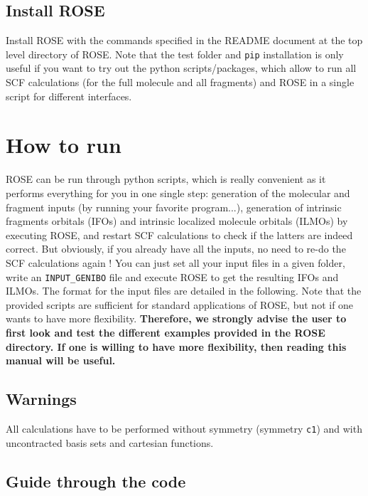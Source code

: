 \documentclass[preprint]{revtex4-1}
\begin{document}
\subsection{Install ROSE}

Install ROSE with the commands specified in the README document at the top level directory of ROSE.
Note that the test folder and \verb|pip| installation is only useful if you want to try out the
python scripts/packages, which allow to run
all SCF calculations (for the full molecule and all fragments)
and ROSE in a single script for different interfaces.

\section{How to run}

ROSE can be run through python scripts, which is really convenient as
it performs everything for you in one single step: generation of the molecular and fragment
inputs (by running your favorite program...), generation of intrinsic fragments orbitals (IFOs) and intrinsic localized molecule orbitals (ILMOs) by executing ROSE,
and restart SCF calculations to check if the latters are indeed correct.
But obviously, if you already have all the inputs, no need to re-do the SCF calculations again !
You can just set all your input files in a given folder, write an \verb|INPUT_GENIBO| file
and execute ROSE to get the resulting IFOs and ILMOs.
The format for the input files are detailed in the following.
Note that the provided scripts are sufficient for standard applications of ROSE, but not if one wants to have more flexibility.
{\bf Therefore, we strongly advise the user to first look and test the
different examples provided in the ROSE directory. If one is willing to have more flexibility, then reading this manual will be useful.}

\subsection{Warnings}

All calculations have to be performed without symmetry (symmetry \verb|c1|) and
with uncontracted basis sets and
cartesian functions.

\subsection{Guide through the code}
\end{document}
